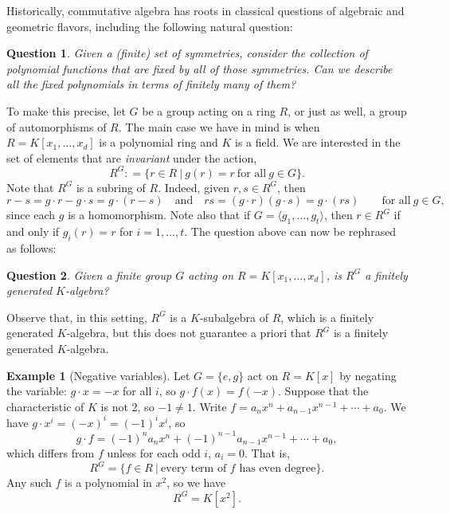 \documentclass{amsart}[12pt]
\numberwithin{equation}{section}
\theoremstyle{plain} %
\newtheorem{question}{Question}
\theoremstyle{definition}
\newtheorem{example}[equation]{Example}
\theoremstyle{remark}
\begin{document}
Historically, commutative algebra has roots in classical questions of algebraic and geometric flavors, including the following natural question:

\begin{question}
	Given a (finite) set of symmetries, consider the collection of polynomial functions that are fixed by all of those symmetries. Can we describe all the fixed polynomials in terms of finitely many of them?
\end{question}


To make this precise, let $G$ be a group acting on a ring $R$, or just as well, a group of automorphisms of $R$. The main case we have in mind is when $R=K[x_1,\dots,x_d]$ is a polynomial ring and $K$ is a field. We are interested in the set of elements that are \emph{invariant} under the action,
\[ R^G : = \{ r \in R \ | \ g(r) = r \ \text{for all} \ g\in G\}. \]
Note that $R^G$ is a subring of $R$. Indeed, given $r,s\in R^G$, then
\[r-s=g \cdot r-g \cdot s =g \cdot (r-s) \quad \text{and}\quad r s = (g \cdot r) (g\cdot s) = g \cdot (rs) \qquad \text{for all} \ g\in G,\]
since each $g$ is a homomorphism. Note also that if $G=\langle g_1,\dots,g_t\rangle$, then $r\in R^G$ if and only if $g_i(r)=r$ for $i=1,\dots,t$. The question above can now be rephrased as follows:

\begin{question}
	Given a finite group $G$ acting on $R=K[x_1,\dots,x_d]$, is $R^G$ a finitely generated $K$-algebra?
\end{question}

Observe that, in this setting, $R^G$ is a $K$-subalgebra of $R$, which is a finitely generated $K$-algebra, but this does not guarantee a priori that $R^G$ is a finitely generated $K$-algebra.

\begin{example}[Negative variables]\label{rootofunityinvariants}
	Let $G=\{e,g\}$ act on $R=K[x]$ by negating the variable: $g \cdot x = -x$ for all $i$, so $g \cdot f(x) = f(-x)$. Suppose that the characteristic of $K$ is not 2, so $-1\neq 1$. 
	Write $f= a_n x^n + a_{n-1} x^{n-1} + \cdots + a_0$.  We have $g \cdot x^i=(-x)^i = (-1)^i x^i$, so
	\[ g\cdot f = (-1)^n a_n x^n+ (-1)^{n-1} a_{n-1} x^{n-1} +  \cdots  + a_0, \]
	which differs from $f$ unless for each odd $i$, $a_i=0$. That is,
	\[ R^G = \{ f \in R \ | \ \text{every term of $f$ has even degree}\}.\]
	Any such $f$ is a polynomial in $x^2$, so we have
	\[ R^G = K[x^2].\]
		 \end{example}
		 
\end{document}
